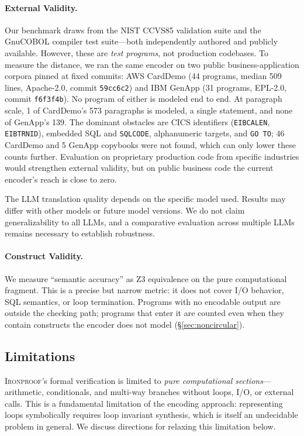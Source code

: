 \documentclass[sigconf,nonacm]{acmart}
\begin{document}
\paragraph{External Validity.} Our benchmark draws from the NIST CCVS85 validation suite and the GnuCOBOL compiler test suite---both independently authored and publicly available. However, these are \emph{test programs}, not production codebases. To measure the distance, we ran the same encoder on two public business-application corpora pinned at fixed commits: AWS CardDemo (44 programs, median 509 lines, Apache-2.0, commit \texttt{59cc6c2}) and IBM GenApp (31 programs, EPL-2.0, commit \texttt{f6f3f4b}). No program of either is modeled end to end. At paragraph scale, 1 of CardDemo's 573 paragraphs is modeled, a single statement, and none of GenApp's 139. The dominant obstacles are CICS identifiers (\texttt{EIBCALEN}, \texttt{EIBTRNID}), embedded SQL and \texttt{SQLCODE}, alphanumeric targets, and \texttt{GO TO}; 46 CardDemo and 5 GenApp copybooks were not found, which can only lower these counts further. Evaluation on proprietary production code from specific industries would strengthen external validity, but on public business code the current encoder's reach is close to zero.

The LLM translation quality depends on the specific model used. Results may differ with other models or future model versions. We do not claim generalizability to all LLMs, and a comparative evaluation across multiple LLMs remains necessary to establish robustness.

\paragraph{Construct Validity.} We measure ``semantic accuracy'' as Z3 equivalence on the pure computational fragment. This is a precise but narrow metric: it does not cover I/O behavior, SQL semantics, or loop termination. Programs with no encodable output are outside the checking path; programs that enter it are counted even when they contain constructs the encoder does not model (\S\ref{sec:noncircular}).

\subsection{Limitations}

\textsc{Ironproof}'s formal verification is limited to \emph{pure computational sections}---arithmetic, conditionals, and multi-way branches without loops, I/O, or external calls. This is a fundamental limitation of the encoding approach: representing loops symbolically requires loop invariant synthesis, which is itself an undecidable problem in general. We discuss directions for relaxing this limitation below.
\end{document}
